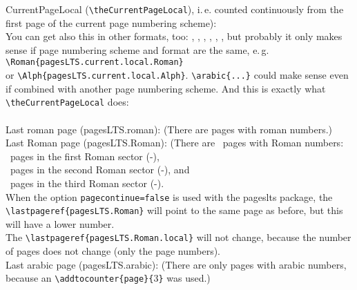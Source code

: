 \documentclass[british]{article}
\def\pagesLTSexampleArabic{3}
\begin{document}
\noindent CurrentPageLocal (\verb|\theCurrentPageLocal|),
i.\,e. counted continuously from the first page of the
current page numbering scheme): \theCurrentPageLocal \\
You can get also this in other formats, too:
, ,
, ,
, ,
but probably it only makes sense if page numbering scheme and format are
the same, e.\,g.\\
\verb|\Roman{pagesLTS.current.local.Roman}|\\
or \verb|\Alph{pagesLTS.current.local.Alph}|. \verb|\arabic{...}| could
make sense even if combined with another page numbering scheme.
And this is exactly what \verb|\theCurrentPageLocal| does:\\
\\

\noindent Last roman page (pagesLTS.roman): 
(There are  pages with roman numbers.)\\

\noindent Last Roman page (pagesLTS.Roman): 
(There are ~pages with Roman numbers:\\
~pages in the first Roman sector
(\pageref{Roman}{\hskip3em }-),\\
~pages in the second Roman sector
(\pageref{Roman2}{\hskip3em }-), and\\
~pages in the third Roman sector
(\pageref{Roman3}{\hskip3em }-).\\

When the option \texttt{pagecontinue=false} is used with the
\textsf{pageslts} package, the \verb|\lastpageref{pagesLTS.Roman}| will
point to the same page as before, but this will have a lower number.\\
The \verb|\lastpageref{pagesLTS.Roman.local}| will not change,
because the number of pages does not change (only the page numbers).\\

\noindent Last arabic page (pagesLTS.arabic): 
(There are only  pages with arabic numbers,
because an \verb|\addtocounter{page}{|\pagesLTSexampleArabic\verb|}| was used.)\\
\end{document}
